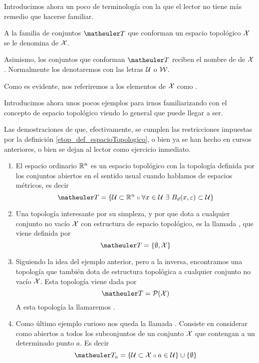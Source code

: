 Introducimos ahora un poco de terminología con la que el lector no tiene más remedio que hacerse familiar.
\begin{obs}[Terminología]
	\label{etop_obs_terminologia}
	A la familia de conjuntos $\T$ que conforman un espacio topológico $\mathcal{X}$ se le denomina  de $\mathcal{X}$.
	
	Asimismo, los conjuntos que conforman $\T$ reciben el nombre de  de $\mathcal{X}$. Normalmente los denotaremos con las letras $\mathcal{U}$ o $\mathcal{W}$.
	
	Como es evidente, nos referiremos a los elementos de $\mathcal{X}$ como .
\end{obs}
Introducimos ahora unos pocos ejemplos para irnos familiarizando con el concepto de espacio topológico viendo lo general que puede llegar a ser.
\begin{exa}[Topologías]
	\label{etop_exa_topologias}
	Las demostraciones de que, efectivamente, se cumplen las restricciones impuestas por la definición \ref{etop_def_espacioTopologico}, o bien ya se han hecho en cursos anteriores, o bien se dejan al lector como ejercicio inmediato.
	\begin{enumerate}
		\item El espacio ordinario $\mathbb{R}^n$ es un espacio topológico con la topología definida por los conjuntos abiertos en el sentido usual cuando hablamos de espacios métricos, es decir
		\begin{equation}
			\label{etop_eq_topologiaRn}
			\T = \{\U\subset\R^n\tq \forall x\in\U\ \exists\  B_{d}(x,\varepsilon)\subset\U\}
		\end{equation}
		\item Una topología interesante por su simpleza, y por que dota a cualquier conjunto no vacío $\mathcal{X}$ con estructura de espacio topológico, es la llamada , que viene definida por \begin{equation}
		\label{etop_eq_topologiaTrivial}
			\T=\{\emptyset, \X\}
		\end{equation}
		\item Siguiendo la idea del ejemplo anterior, pero a la inversa, encontramos una topología que también dota de estructura topológica a cualquier conjunto no vacío $\mathcal{X}$. Esta topología viene dada por
		\begin{equation}
		\label{etop_eq_topologiaDiscreta}
			\T = \partes(\X)
		\end{equation}
		A esta topología la llamaremos .
		\item Como último ejemplo curioso nos queda la llamada . Consiste en considerar como abiertos a todos los subconjuntos de un conjunto $\mathcal{X}$ que contengan a un determinado punto $a$. Es decir
		\begin{equation}
		\label{etop_eq_topologiaPunto}
			\T_a = \{\U \subset \X\tq a\in\U\}\cup\{\emptyset\}
		\end{equation}
		

\end{enumerate}
\end{exa}
